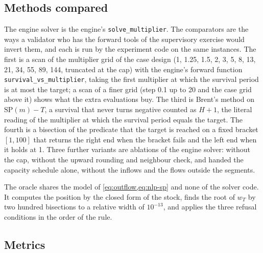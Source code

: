 \subsection{Methods compared}

The engine solver is the engine's \texttt{solve\_multiplier}. The comparators are the ways a validator who has the forward tools of the supervisory exercise would invert them, and each is run by the experiment code on the same instances. The first is a scan of the multiplier grid of the case design (1, 1.25, 1.5, 2, 3, 5, 8, 13, 21, 34, 55, 89, 144, truncated at the cap) with the engine's forward function \texttt{survival\_vs\_multiplier}, taking the first multiplier at which the survival period is at most the target; a scan of a finer grid (step 0.1 up to 20 and the case grid above it) shows what the extra evaluations buy. The third is Brent's method on $\mathrm{SP}(m)-T$, a survival that never turns negative counted as $H+1$, the literal reading of the multiplier at which the survival period equals the target. The fourth is a bisection of the predicate that the target is reached on a fixed bracket $[1,100]$ that returns the right end when the bracket fails and the left end when it holds at 1. Three further variants are ablations of the engine solver: without the cap, without the upward rounding and neighbour check, and handed the capacity schedule alone, without the inflows and the flows outside the segments.

The oracle shares the model of \cref{eq:outflow,eq:nlp-sp} and none of the solver code. It computes the position by the closed form of the stock, finds the root of $w_T$ by two hundred bisections to a relative width of $10^{-13}$, and applies the three refusal conditions in the order of the rule.

\subsection{Metrics}

